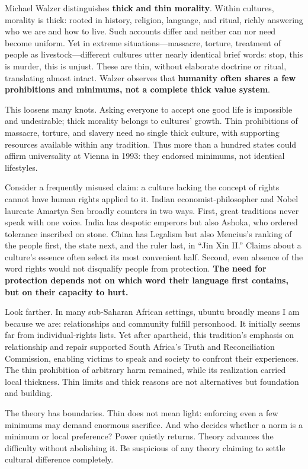 Michael Walzer distinguishes \textbf{thick and thin morality}. Within cultures, morality is thick: rooted in history, religion, language, and ritual, richly answering who we are and how to live. Such accounts differ and neither can nor need become uniform. Yet in extreme situations---massacre, torture, treatment of people as livestock---different cultures utter nearly identical brief words: stop, this is murder, this is unjust. These are thin, without elaborate doctrine or ritual, translating almost intact. Walzer observes that \textbf{humanity often shares a few prohibitions and minimums, not a complete thick value system}.

This loosens many knots. Asking everyone to accept one good life is impossible and undesirable; thick morality belongs to cultures' growth. Thin prohibitions of massacre, torture, and slavery need no single thick culture, with supporting resources available within any tradition. Thus more than a hundred states could affirm universality at Vienna in 1993: they endorsed minimums, not identical lifestyles.

Consider a frequently misused claim: a culture lacking the concept of rights cannot have human rights applied to it. Indian economist-philosopher and Nobel laureate Amartya Sen broadly counters in two ways. First, great traditions never speak with one voice. India has despotic emperors but also Ashoka, who ordered tolerance inscribed on stone. China has Legalism but also Mencius's ranking of the people first, the state next, and the ruler last, in ``Jin Xin II.'' Claims about a culture's essence often select its most convenient half. Second, even absence of the word rights would not disqualify people from protection. \textbf{The need for protection depends not on which word their language first contains, but on their capacity to hurt.}

Look farther. In many sub-Saharan African settings, ubuntu broadly means I am because we are: relationships and community fulfill personhood. It initially seems far from individual-rights lists. Yet after apartheid, this tradition's emphasis on relationship and repair supported South Africa's Truth and Reconciliation Commission, enabling victims to speak and society to confront their experiences. The thin prohibition of arbitrary harm remained, while its realization carried local thickness. Thin limits and thick reasons are not alternatives but foundation and building.

The theory has boundaries. Thin does not mean light: enforcing even a few minimums may demand enormous sacrifice. And who decides whether a norm is a minimum or local preference? Power quietly returns. Theory advances the difficulty without abolishing it. Be suspicious of any theory claiming to settle cultural difference completely.

